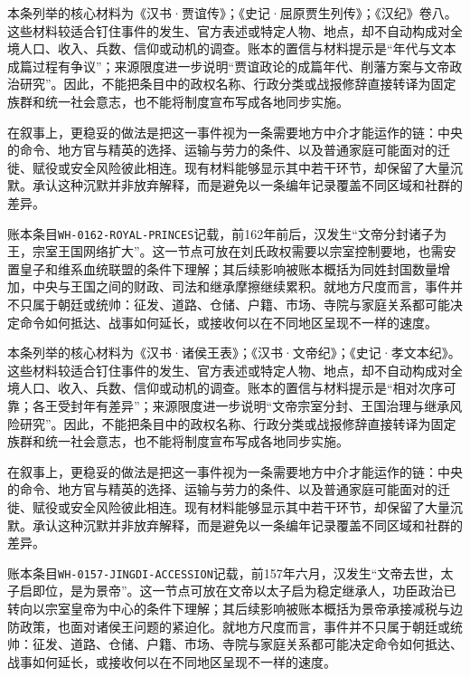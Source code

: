 本条列举的核心材料为《汉书·贾谊传》；《史记·屈原贾生列传》；《汉纪》卷八。这些材料较适合钉住事件的发生、官方表述或特定人物、地点，却不自动构成对全境人口、收入、兵数、信仰或动机的调查。账本的置信与材料提示是“年代与文本成篇过程有争议”；来源限度进一步说明“贾谊政论的成篇年代、削藩方案与文帝政治研究”。因此，不能把条目中的政权名称、行政分类或战报修辞直接转译为固定族群和统一社会意志，也不能将制度宣布写成各地同步实施。

在叙事上，更稳妥的做法是把这一事件视为一条需要地方中介才能运作的链：中央的命令、地方官与精英的选择、运输与劳力的条件、以及普通家庭可能面对的迁徙、赋役或安全风险彼此相连。现有材料能够显示其中若干环节，却保留了大量沉默。承认这种沉默并非放弃解释，而是避免以一条编年记录覆盖不同区域和社群的差异。

账本条目\texttt{WH-0162-ROYAL-PRINCES}记载，前162年前后，汉发生“文帝分封诸子为王，宗室王国网络扩大”。这一节点可放在刘氏政权需要以宗室控制要地，也需安置皇子和维系血统联盟的条件下理解；其后续影响被账本概括为同姓封国数量增加，中央与王国之间的财政、司法和继承摩擦继续累积。就地方尺度而言，事件并不只属于朝廷或统帅：征发、道路、仓储、户籍、市场、寺院与家庭关系都可能决定命令如何抵达、战事如何延长，或接收何以在不同地区呈现不一样的速度。

本条列举的核心材料为《汉书·诸侯王表》；《汉书·文帝纪》；《史记·孝文本纪》。这些材料较适合钉住事件的发生、官方表述或特定人物、地点，却不自动构成对全境人口、收入、兵数、信仰或动机的调查。账本的置信与材料提示是“相对次序可靠；各王受封年有差异”；来源限度进一步说明“文帝宗室分封、王国治理与继承风险研究”。因此，不能把条目中的政权名称、行政分类或战报修辞直接转译为固定族群和统一社会意志，也不能将制度宣布写成各地同步实施。

在叙事上，更稳妥的做法是把这一事件视为一条需要地方中介才能运作的链：中央的命令、地方官与精英的选择、运输与劳力的条件、以及普通家庭可能面对的迁徙、赋役或安全风险彼此相连。现有材料能够显示其中若干环节，却保留了大量沉默。承认这种沉默并非放弃解释，而是避免以一条编年记录覆盖不同区域和社群的差异。

账本条目\texttt{WH-0157-JINGDI-ACCESSION}记载，前157年六月，汉发生“文帝去世，太子启即位，是为景帝”。这一节点可放在文帝以太子启为稳定继承人，功臣政治已转向以宗室皇帝为中心的条件下理解；其后续影响被账本概括为景帝承接减税与边防政策，也面对诸侯王问题的紧迫化。就地方尺度而言，事件并不只属于朝廷或统帅：征发、道路、仓储、户籍、市场、寺院与家庭关系都可能决定命令如何抵达、战事如何延长，或接收何以在不同地区呈现不一样的速度。

